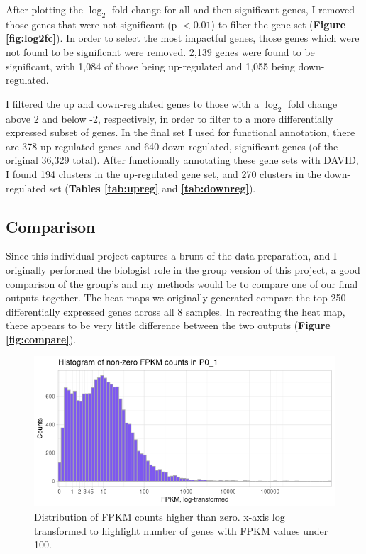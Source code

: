 \documentclass{article}
\begin{document}
After plotting the $\log_2$ fold change for all and then significant genes, I removed those genes that were not significant (p $< 0.01$) to filter the gene set (\textbf{Figure \ref{fig:log2fc}}). In order to select the most impactful genes, those genes which were not found to be significant were removed. 2,139 genes were found to be significant, with 1,084 of those being up-regulated and 1,055 being down-regulated.

I filtered the up and down-regulated genes to those with a $\log_2$ fold change above 2 and below -2, respectively, in order to filter to a more differentially expressed subset of genes. In the final set I used for functional annotation, there are 378 up-regulated genes and 640 down-regulated, significant genes (of the original 36,329 total). After functionally annotating these gene sets with DAVID, I found 194 clusters in the up-regulated gene set, and 270 clusters in the down-regulated set (\textbf{Tables \ref{tab:upreg}} and \textbf{\ref{tab:downreg}}).

\subsection{Comparison}
Since this individual project captures a brunt of the data preparation, and I originally performed the biologist role in the group version of this project, a good comparison of the group's and my methods would be to compare one of our final outputs together. The heat maps we originally generated compare the top 250 differentially expressed genes across all 8 samples. In recreating the heat map, there appears to be very little difference between the two outputs (\textbf{Figure \ref{fig:compare}}).

\begin{figure}[p]
    \centering
    \includegraphics[width=\textwidth]{plots/Fig2-fpkm-histo.png}
    \caption{Distribution of FPKM counts higher than zero. x-axis log transformed to highlight number of genes with FPKM values under 100.}
    \label{fig:fpkm}
\end{figure}
\end{document}
